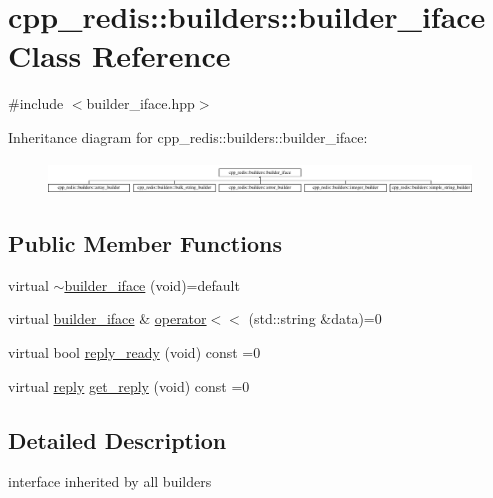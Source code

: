 \hypertarget{classcpp__redis_1_1builders_1_1builder__iface}{}\section{cpp\+\_\+redis\+:\+:builders\+:\+:builder\+\_\+iface Class Reference}
\label{classcpp__redis_1_1builders_1_1builder__iface}


{\ttfamily \#include $<$builder\+\_\+iface.\+hpp$>$}

Inheritance diagram for cpp\+\_\+redis\+:\+:builders\+:\+:builder\+\_\+iface\+:\begin{figure}[H]
\begin{center}
\leavevmode
\includegraphics[height=0.888889cm]{classcpp__redis_1_1builders_1_1builder__iface}
\end{center}
\end{figure}
\subsection*{Public Member Functions}
\begin{DoxyCompactItemize}
\item 
virtual \hyperlink{classcpp__redis_1_1builders_1_1builder__iface_afaf3d6cdb3b67b62ed88477dc3d4d1b6}{$\sim$builder\+\_\+iface} (void)=default
\item 
virtual \hyperlink{classcpp__redis_1_1builders_1_1builder__iface}{builder\+\_\+iface} \& \hyperlink{classcpp__redis_1_1builders_1_1builder__iface_a9892bbc9c887c31c2742dad4476e2fa6}{operator$<$$<$} (std\+::string \&data)=0
\item 
virtual bool \hyperlink{classcpp__redis_1_1builders_1_1builder__iface_a40db9a31d4ea1771777e74146d31e12d}{reply\+\_\+ready} (void) const =0
\item 
virtual \hyperlink{classcpp__redis_1_1reply}{reply} \hyperlink{classcpp__redis_1_1builders_1_1builder__iface_afd2ff2c2371c2a486116543b638b9413}{get\+\_\+reply} (void) const =0
\end{DoxyCompactItemize}


\subsection{Detailed Description}
interface inherited by all builders 

